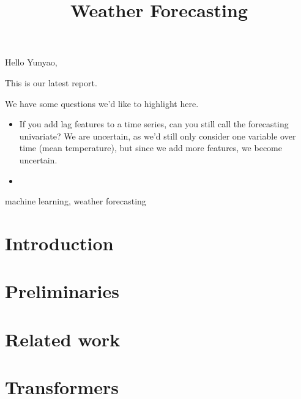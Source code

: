 


Hello Yunyao,

This is our latest report.

We have some questions we'd like to highlight here.

\begin{itemize}
    \item If you add lag features to a time series, can you still call the forecasting univariate? We are uncertain, as we'd still only consider one variable over time (mean temperature), but since we add more features, we become uncertain.
    \item {}
\end{itemize}

\newpage

\title{Weather Forecasting}
\author{
    \and
    \and
    \and
}

\maketitle

\begin{abstract}
\end{abstract}

\begin{IEEEkeywords}
machine learning, weather forecasting
\end{IEEEkeywords}

\section{Introduction}


\section{Preliminaries}


\section{Related work}\label{sec:relatedwork}



\section{Transformers}



